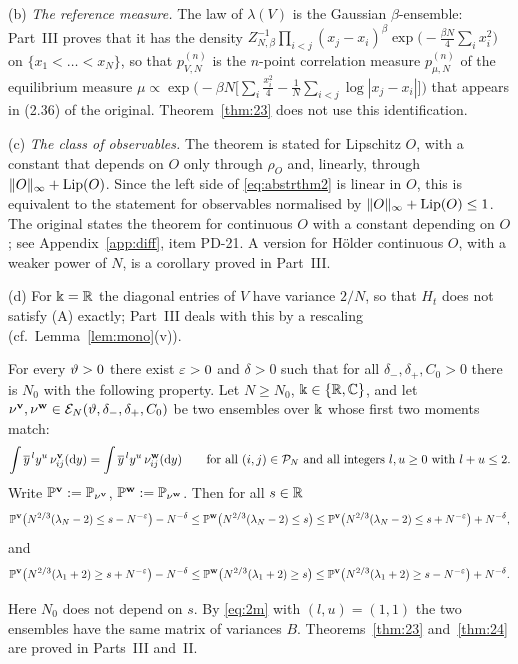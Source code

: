 (b) \emph{The reference measure.} The law of $\lambda(V)$ is the Gaussian $\beta$-ensemble: Part~III proves that it has the density
$Z_{N,\beta}^{-1}\prod_{i<j}(x_j-x_i)^\beta\exp\big(-\frac{\beta N}4\sum_ix_i^2\big)$ on $\{x_1<\dots<x_N\}$, so that $p^{(n)}_{V,N}$ is the $n$-point correlation measure $p^{(n)}_{\mu,N}$ of the equilibrium measure $\mu\propto\exp\big(-\beta N\big[\sum_i\frac{x_i^2}4-\frac1N\sum_{i<j}\log|x_j-x_i|\big]\big)$ that appears in (2.36) of the original.
Theorem~\ref{thm:23} does not use this identification.

(c) \emph{The class of observables.} The theorem is stated for Lipschitz $O$, with a constant that depends on $O$ only through $\rho_O$ and, linearly, through $\|O\|_\infty+\operatorname{Lip}(O)$.
Since the left side of \eqref{eq:abstrthm2} is linear in $O$, this is equivalent to the statement for observables normalised by $\|O\|_\infty+\operatorname{Lip}(O)\le1$.
The original states the theorem for continuous $O$ with a constant depending on $O$; see Appendix~\ref{app:diff}, item PD-21. A version for H\"older continuous $O$, with a weaker power of $N$, is a corollary proved in Part~III.

(d) For $\Bbbk=\mathbb{R}$ the diagonal entries of $V$ have variance $2/N$, so that $H_t$ does not satisfy \textup{(A)} exactly; Part~III deals with this by a rescaling (cf.\ Lemma~\ref{lem:mono}(v)).

\begin{theorem}\label{thm:24}
For every $\vartheta>0$ there exist $\varepsilon>0$ and $\delta>0$ such that for all $\delta_-,\delta_+,C_0>0$ there is $N_0$ with the following property.
Let $N\ge N_0$, $\Bbbk\in\{\mathbb{R},\mathbb{C}\}$, and let $\nu^{\mathbf v},\nu^{\mathbf w}\in\mathcal E_N(\vartheta,\delta_-,\delta_+,C_0)$ be two ensembles over $\Bbbk$ whose first two moments match:
\begin{equation}\label{eq:2m}
 \int\overline{y}^{\,l}y^{u}\,\nu^{\mathbf v}_{ij}(\mathrm{d} y)=\int\overline{y}^{\,l}y^{u}\,\nu^{\mathbf w}_{ij}(\mathrm{d} y)\qquad\text{for all }(i,j)\in\mathcal P_N\text{ and all integers }l,u\ge0\text{ with }l+u\le2 .
\end{equation}
Write $\mathbb{P}^{\mathbf v}:=\mathbb{P}_{\nu^{\mathbf v}}$, $\mathbb{P}^{\mathbf w}:=\mathbb{P}_{\nu^{\mathbf w}}$. Then for all $s\in\mathbb{R}$
\begin{equation}\label{eq:tw}
 \mathbb{P}^{\mathbf v}\big(N^{2/3}(\lambda_N-2)\le s-N^{-\varepsilon}\big)-N^{-\delta}\le\mathbb{P}^{\mathbf w}\big(N^{2/3}(\lambda_N-2)\le s\big)\le
 \mathbb{P}^{\mathbf v}\big(N^{2/3}(\lambda_N-2)\le s+N^{-\varepsilon}\big)+N^{-\delta},
\end{equation}
and
\begin{equation}\label{eq:tw1}
 \mathbb{P}^{\mathbf v}\big(N^{2/3}(\lambda_1+2)\ge s+N^{-\varepsilon}\big)-N^{-\delta}\le\mathbb{P}^{\mathbf w}\big(N^{2/3}(\lambda_1+2)\ge s\big)\le
 \mathbb{P}^{\mathbf v}\big(N^{2/3}(\lambda_1+2)\ge s-N^{-\varepsilon}\big)+N^{-\delta}.
\end{equation}
\end{theorem}
\noindent Here $N_0$ does not depend on $s$. By \eqref{eq:2m} with $(l,u)=(1,1)$ the two ensembles have the same matrix of variances $B$.
Theorems~\ref{thm:23} and~\ref{thm:24} are proved in Parts~III and~II.

